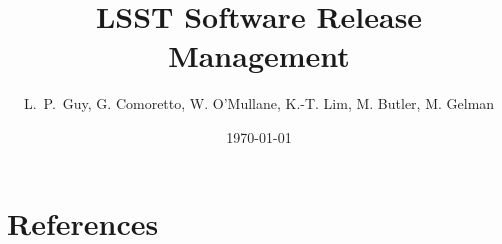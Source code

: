 \documentclass[DM,lsstdraft,toc]{lsstdoc}
\title{LSST Software Release Management}
\author{%
L.~P.~Guy, G. Comoretto, W. O'Mullane, K.-T. Lim, M. Butler, M. Gelman
}
\date{\today}
\begin{document}
\maketitle



\newpage


\newpage


\newpage


\newpage
\appendix

\section{References} \label{sec:bib}


\printglossaries
\end{document}
